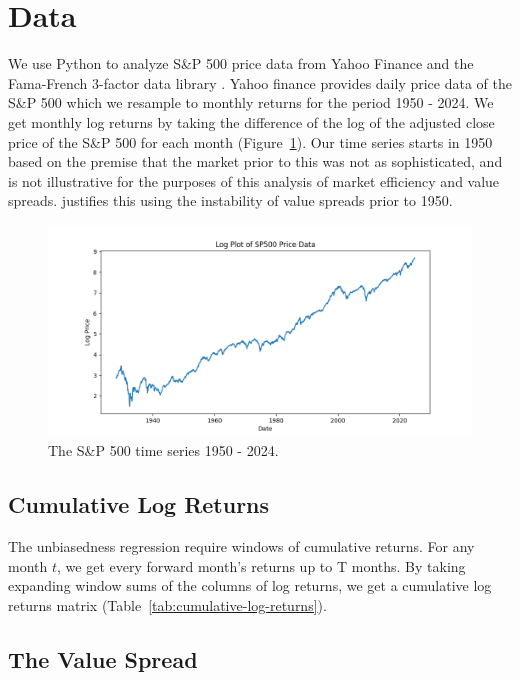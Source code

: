\section{Data}
\label{sec:data}

We use Python \citep{python3} to analyze S\&P 500 price data from Yahoo Finance \citep{yahoo_finance_gspc} and the Fama-French 3-factor data library \citep{french_website}.
Yahoo finance provides daily price data of the S\&P 500 which we resample to monthly returns for the period 1950 - 2024. We get monthly log returns by taking the
difference of the log of the adjusted close price of the S\&P 500 for each month (Figure~\ref{fig:sp500-returns}). Our time series starts in 1950
based on the premise that the market prior to this was not as sophisticated, and is not illustrative for the purposes of this analysis of market efficiency and value spreads. \citep{asness_2024} justifies this using the 
instability of value spreads prior to 1950.

\begin{figure}[h!]
    \centering
    \includegraphics[width=1\textwidth]{../data/03-analysis_data_visuals/sp500_log_price.png}
    \caption{The S\&P 500 time series 1950 - 2024.}
    \label{fig:sp500-returns}
\end{figure}

\subsection{Cumulative Log Returns}

The unbiasedness regression require windows of cumulative returns. For any month $t$, we get every forward month's returns up to T months.
By taking expanding window sums of the columns of log returns, we get a cumulative log returns matrix (Table~\ref{tab:cumulative-log-returns}).

\subsection{The Value Spread}

